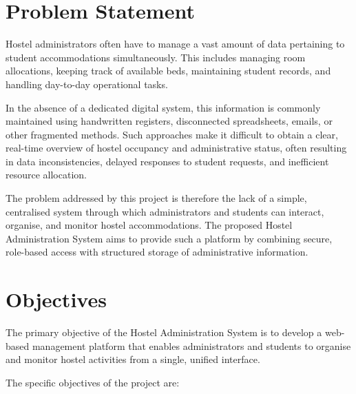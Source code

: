 \section{Problem Statement}

Hostel administrators often have to manage a vast amount of data pertaining to student accommodations simultaneously. This includes managing room allocations, keeping track of available beds, maintaining student records, and handling day-to-day operational tasks.

In the absence of a dedicated digital system, this information is commonly maintained using handwritten registers, disconnected spreadsheets, emails, or other fragmented methods. Such approaches make it difficult to obtain a clear, real-time overview of hostel occupancy and administrative status, often resulting in data inconsistencies, delayed responses to student requests, and inefficient resource allocation.

The problem addressed by this project is therefore the lack of a simple, centralised system through which administrators and students can interact, organise, and monitor hostel accommodations. The proposed Hostel Administration System aims to provide such a platform by combining secure, role-based access with structured storage of administrative information.

\section{Objectives}

The primary objective of the Hostel Administration System is to develop a web-based management platform that enables administrators and students to organise and monitor hostel activities from a single, unified interface.

The specific objectives of the project are:

